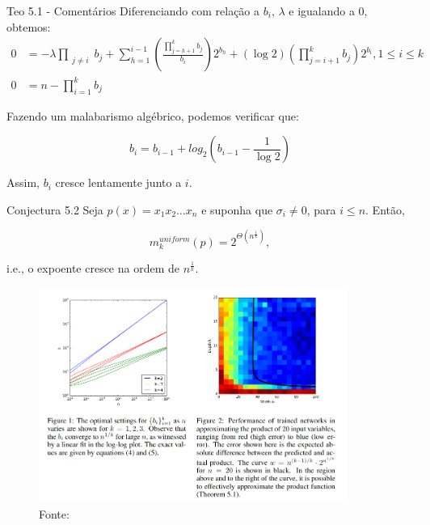 \documentclass{beamer}
\theoremstyle{definition}
\begin{document}
\begin{frame}{Teo 5.1 - Comentários}
    \small
    Diferenciando com relação a $b_i$, $\lambda$ e igualando a 0, obtemos:
    \begin{align*}
        0 &= -\lambda \prod_{\substack{j \ne i}} b_j 
        + \sum_{h=1}^{i-1} \left( \frac{\prod_{j=h+1}^{k} b_j}{b_i} \right) 2^{b_h} 
        + (\log 2) \left( \prod_{j=i+1}^{k} b_j \right) 2^{b_i}, 1 \leq i \leq k \\
        0 &=  n - \prod_{i=1}^k b_j
    \end{align*}\pause

    Fazendo um malabarismo algébrico, podemos verificar que:

    \begin{equation*}
        b_i = b_{i-1} + log_2 \left(b_{i-1} - \frac{1}{\log 2}\right)
    \end{equation*} \pause

    Assim, $b_i$ cresce lentamente junto a $i$.

\end{frame}

\begin{frame}{Conjectura 5.2}
    Seja $p(x) = x_1x_2 \dots x_n$ e suponha que $\sigma_i \neq 0$, para $i \leq n$. Então, 

        \begin{equation*}
            m_k^{uniform}(p) = 2^{\Theta (n^{\frac 1 k})},
        \end{equation*}
    
    i.e., o expoente cresce na ordem de $n^{\frac 1 k}$.
\end{frame}

\begin{frame}
    \begin{figure}
        \includegraphics[width=0.9\textwidth]{fig/5.2.png}
        \caption*{Fonte: \cite{rolnick2018}}
    \end{figure}
\end{frame}
\end{document}
